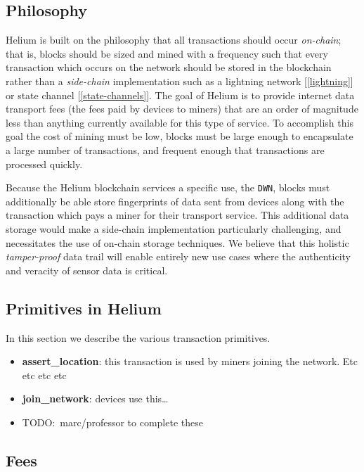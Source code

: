\documentclass[letterpaper,11pt]{article}
\newcommand{\todo}[1]{}
\renewcommand{\todo}[1]{{\color{red} TODO:\ {#1}}}
\begin{document}
\subsection{Philosophy}

Helium is built on the philosophy that all transactions should occur \emph{on-chain}; that is, blocks should be sized and mined with a frequency such that every transaction which occurs on the network should be stored in the blockchain rather than a \emph{side-chain} implementation such as a lightning network [\ref{lightning}] or state channel [\ref{state-channels}]. The goal of Helium is to provide internet data transport fees (the fees paid by devices to miners) that are an order of magnitude less than anything currently available for this type of service. To accomplish this goal the cost of mining must be low, blocks must be large enough to encapsulate a large number of transactions, and frequent enough that transactions are processed quickly.

Because the Helium blockchain services a specific use, the \verb|DWN|, blocks must additionally be able store fingerprints of data sent from devices along with the transaction which pays a miner for their transport service. This additional data storage would make a side-chain implementation particularly challenging, and necessitates the use of on-chain storage techniques. We believe that this holistic \emph{tamper-proof} data trail will enable entirely new use cases where the authenticity and veracity of sensor data is critical.

\subsection{Primitives in Helium}

In this section we describe the various transaction primitives.

\begin{itemize}
  \item \textbf{assert\_location}: this transaction is used by miners joining the network. Etc etc etc etc
  \item \textbf{join\_network}: devices use this\ldots
  \item \todo{marc/professor to complete these}
\end{itemize}

\subsection{Fees}
\end{document}
